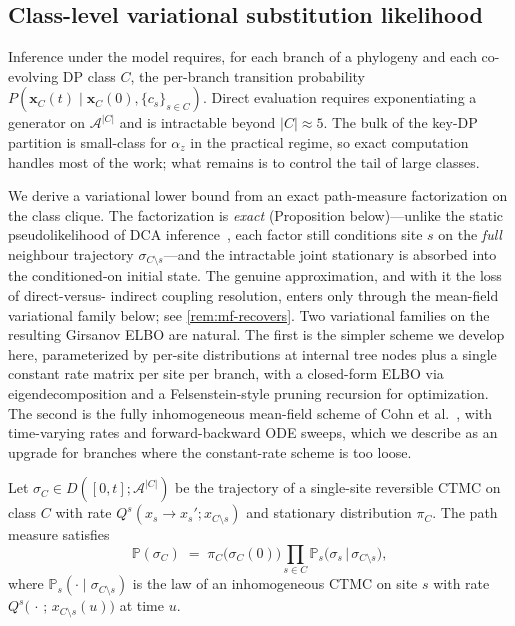 \subsection{Class-level variational substitution likelihood}
\label{sec:class-elbo}

Inference under the model requires, for each branch of a phylogeny
and each co-evolving DP class $C$, the per-branch transition
probability $P(\mathbf{x}_C(t) \mid \mathbf{x}_C(0), \{c_s\}_{s \in C})$.
Direct evaluation requires exponentiating a generator on
$\mathcal{A}^{|C|}$ and is intractable beyond $|C| \approx 5$. The
bulk of the key-DP partition is small-class for $\alpha_z$ in the
practical regime, so exact computation handles most of the work;
what remains is to control the tail of large classes.

We derive a variational lower bound from an exact path-measure
factorization on the class clique. The factorization is \emph{exact}
(Proposition below)---unlike the static pseudolikelihood of DCA
inference~\citep{ekeberg2013}, each factor still conditions site $s$ on
the \emph{full} neighbour trajectory $\sigma_{C\setminus s}$---and the
intractable joint stationary is absorbed into the conditioned-on initial
state. The genuine approximation, and with it the loss of direct-versus-
indirect coupling resolution, enters only through the mean-field
variational family below; see \autoref{rem:mf-recovers}.
Two variational families on the resulting Girsanov ELBO are natural.
The first is the simpler scheme we develop here, parameterized by
per-site distributions at internal tree nodes plus a single constant
rate matrix per site per branch, with a closed-form ELBO via
eigendecomposition and a Felsenstein-style pruning recursion for
optimization. The second is the fully inhomogeneous mean-field
scheme of Cohn et al.~\citep{cohn2010}, with time-varying rates and
forward-backward ODE sweeps, which we describe as an upgrade for
branches where the constant-rate scheme is too loose.

\begin{proposition}
Let $\sigma_C \in D([0,t]; \mathcal{A}^{|C|})$ be the trajectory of
a single-site reversible CTMC on class $C$ with rate
$Q^s(x_s \to x_s'; x_{C \setminus s})$ and stationary distribution
$\pi_C$. The path measure satisfies
\[
    \mathbb{P}(\sigma_C) \;=\;
    \pi_C\!\bigl(\sigma_C(0)\bigr)
    \prod_{s \in C} \mathbb{P}_s\!\bigl(\sigma_s \,\big|\, \sigma_{C \setminus s}\bigr),
\]
where $\mathbb{P}_s(\cdot \mid \sigma_{C \setminus s})$ is the law
of an inhomogeneous CTMC on site $s$ with rate
$Q^s\!\bigl(\,\cdot\, ; \, x_{C \setminus s}(u)\bigr)$ at time $u$.
\end{proposition}

